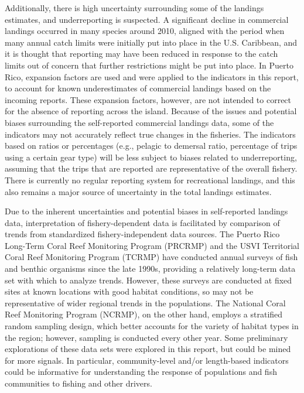 \documentclass[
  letterpaper,
  oneside,
  open=any]{scrbook}
\begin{document}
Additionally, there is high uncertainty surrounding some of the landings
estimates, and underreporting is suspected. A significant decline in
commercial landings occurred in many species around 2010, aligned with
the period when many annual catch limits were initially put into place
in the U.S. Caribbean, and it is thought that reporting may have been
reduced in response to the catch limits out of concern that further
restrictions might be put into place. In Puerto Rico, expansion factors
are used and were applied to the indicators in this report, to account
for known underestimates of commercial landings based on the incoming
reports. These expansion factors, however, are not intended to correct
for the absence of reporting across the island. Because of the issues
and potential biases surrounding the self-reported commercial landings
data, some of the indicators may not accurately reflect true changes in
the fisheries. The indicators based on ratios or percentages (e.g.,
pelagic to demersal ratio, percentage of trips using a certain gear
type) will be less subject to biases related to underreporting, assuming
that the trips that are reported are representative of the overall
fishery. There is currently no regular reporting system for recreational
landings, and this also remains a major source of uncertainty in the
total landings estimates.

Due to the inherent uncertainties and potential biases in self-reported
landings data, interpretation of fishery-dependent data is facilitated
by comparison of trends from standardized fishery-independent data
sources. The Puerto Rico Long-Term Coral Reef Monitoring Program
(PRCRMP) and the USVI Territorial Coral Reef Monitoring Program (TCRMP)
have conducted annual surveys of fish and benthic organisms since the
late 1990s, providing a relatively long-term data set with which to
analyze trends. However, these surveys are conducted at fixed sites at
known locations with good habitat conditions, so may not be
representative of wider regional trends in the populations. The National
Coral Reef Monitoring Program (NCRMP), on the other hand, employs a
stratified random sampling design, which better accounts for the variety
of habitat types in the region; however, sampling is conducted every
other year. Some preliminary explorations of these data sets were
explored in this report, but could be mined for more signals. In
particular, community-level and/or length-based indicators could be
informative for understanding the response of populations and fish
communities to fishing and other drivers.
\end{document}
